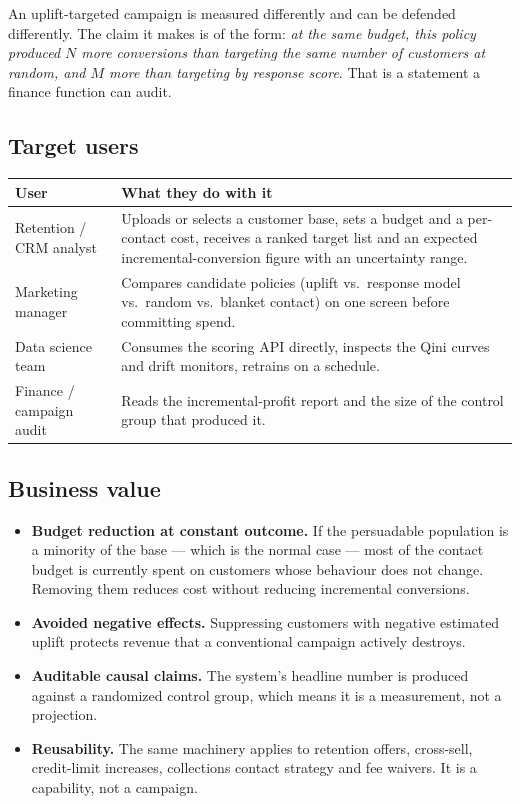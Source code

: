 \documentclass[11pt,a4paper]{article}
\begin{document}
An uplift-targeted campaign is measured differently and can be defended differently. The claim it
makes is of the form: \emph{at the same budget, this policy produced $N$ more conversions than
targeting the same number of customers at random, and $M$ more than targeting by response score}.
That is a statement a finance function can audit.

\subsection{Target users}

\begin{tabularx}{\textwidth}{@{}L{4.2cm}X@{}}
\toprule
\textbf{User} & \textbf{What they do with it} \\
\midrule
Retention / CRM analyst & Uploads or selects a customer base, sets a budget and a per-contact
cost, receives a ranked target list and an expected incremental-conversion figure with an
uncertainty range. \\
Marketing manager & Compares candidate policies (uplift vs.\ response model vs.\ random vs.\
blanket contact) on one screen before committing spend. \\
Data science team & Consumes the scoring API directly, inspects the Qini curves and drift
monitors, retrains on a schedule. \\
Finance / campaign audit & Reads the incremental-profit report and the size of the control group
that produced it. \\
\bottomrule
\end{tabularx}

\subsection{Business value}

\begin{itemize}
\item \textbf{Budget reduction at constant outcome.} If the persuadable population is a minority
of the base --- which is the normal case --- most of the contact budget is currently spent on
customers whose behaviour does not change. Removing them reduces cost without reducing
incremental conversions.
\item \textbf{Avoided negative effects.} Suppressing customers with negative estimated uplift
protects revenue that a conventional campaign actively destroys.
\item \textbf{Auditable causal claims.} The system's headline number is produced against a
randomized control group, which means it is a measurement, not a projection.
\item \textbf{Reusability.} The same machinery applies to retention offers, cross-sell, credit-limit
increases, collections contact strategy and fee waivers. It is a capability, not a campaign.
\end{itemize}
\end{document}
